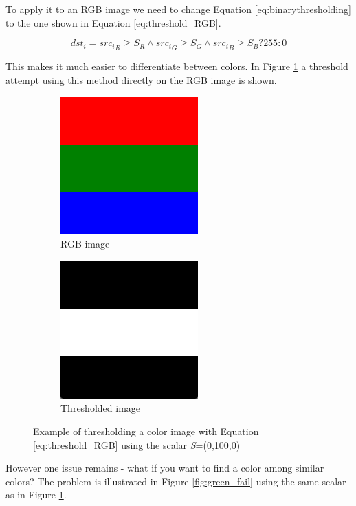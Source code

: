 To apply it to an RGB image we need to change Equation \ref{eq:binarythresholding} to the one shown in Equation \ref{eq:threshold_RGB}.

\begin{equation}
{dst_i} = {src_i}_R \geq S_R \wedge {src_i}_G \geq S_G \wedge {src_i}_B \geq S_B? 255: 0
\label{eq:threshold_RGB}
\end{equation}

This makes it much easier to differentiate between colors. In Figure \ref{fig:RGB_Thresh} a threshold attempt using this method directly on the RGB image is shown.

\begin{figure}
        \centering
        \begin{subfigure}[b]{0.3\textwidth}
                \includegraphics[scale=0.5]{img/RGB}
                \caption{RGB image}
        \end{subfigure}
		\quad
        \begin{subfigure}[b]{0.3\textwidth}
                \includegraphics[scale=0.5]{img/RGBThresh}
                \caption{Thresholded image}
        \end{subfigure}
		\caption{Example of thresholding a color image with Equation \ref{eq:threshold_RGB} using the scalar \textit{S}=(0,100,0)}
		\label{fig:RGB_Thresh}
\end{figure}

However one issue remains - what if you want to find a color among similar colors? The problem is illustrated in Figure \ref{fig:green_fail} using the same scalar as in Figure \ref{fig:RGB_Thresh}.

